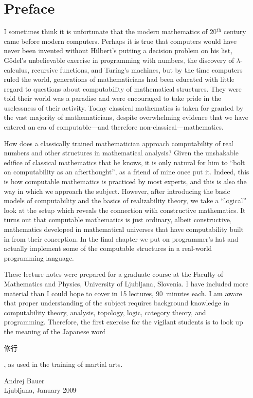 \chapter*{Preface}


I sometimes think it is unfortunate that the modern mathematics of
20${}^{\text{th}}$ century came before modern computers. Perhaps it is
true that computers would have never been invented without Hilbert's
putting a decision problem on his list, G\"odel's unbelievable
exercise in programming with numbers, the discovery of
$\lambda$-calculus, recursive functions, and Turing's machines, but by
the time computers ruled the world, generations of mathematicians had
been educated with little regard to questions about computability of
mathematical structures. They were told their world was a paradise and
were encouraged to take pride in the uselessness of their activity.
Today classical mathematics is taken for granted by the vast majority
of mathematicians, despite overwhelming evidence that we have entered
an era of computable---and therefore non-classical---mathematics.

How does a classically trained mathematician approach computability of
real numbers and other structures in mathematical analysis? Given the
unshakable edifice of classical mathematics that he knows, it is only
natural for him to ``bolt on computability as an afterthought'', as a
friend of mine once put it. Indeed, this is how computable mathematics
is practiced by most experts, and this is also the way in which we
approach the subject. However, after introducing the basic models of
computability and the basics of realizability theory, we take a
``logical'' look at the setup which reveals the connection with
constructive mathematics. It turns out that computable mathematics is
just ordinary, albeit constructive, mathematics developed in
mathematical universes that have computability built in from their
conception. In the final chapter we put on programmer's hat and
actually implement some of the computable structures in a real-world
programming language.

These lecture notes were prepared for a graduate course at the Faculty of Mathematics and
Physics, University of Ljubljana, Slovenia. I have included more material than I could
hope to cover in 15 lectures, 90~minutes each. I am aware that proper understanding of the
subject requires background knowledge in computability theory, analysis, topology, logic,
category theory, and programming. Therefore, the first exercise for the vigilant students
is to look up the meaning of the Japanese word \begin{CJK}{UTF8}{min}修行\end{CJK}, as
used in the training of martial arts.


\bigskip

\begin{flushright}
Andrej Bauer\\
Ljubljana, January 2009
\end{flushright}
